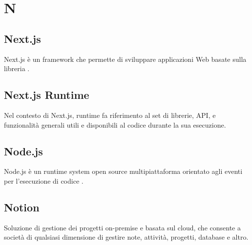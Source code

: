 \chapter{N}

\section{Next.js}\label{sec:Nextjs}
Next.js è un framework che permette di sviluppare applicazioni Web basate sulla libreria .

\section{Next.js Runtime}\label{sec:Nextjs Runtime}
Nel contesto di Next.js, runtime fa riferimento al set di librerie, API, e funzionalità generali utili e disponibili al codice durante la sua esecuzione.


\section{Node.js}\label{sec:Nodejs}
Node.js è un runtime system open source multipiattaforma orientato agli eventi per l'esecuzione di codice .

\section{Notion}
Soluzione di gestione dei progetti on-premise e basata sul cloud, che consente a società di qualsiasi dimensione di gestire note, attività, progetti, database e altro.